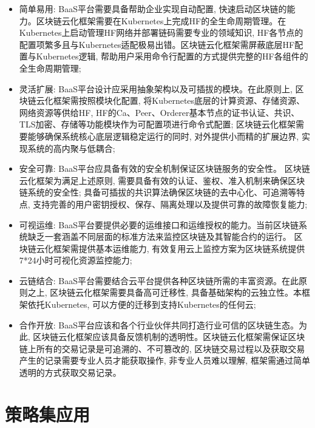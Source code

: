 \begin{itemize}[itemindent=2em]
    \item 简单易用: BaaS平台需要具备帮助企业实现自动配置, 快速启动区块链的能力。区块链云化框架需要在Kubernetes上完成HF的全生命周期管理。在Kubernetes上启动管理HF网络并部署链码需要专业的领域知识, HF各节点的配置项繁多且与Kubernetes适配极易出错。区块链云化框架需屏蔽底层HF配置与Kubernetes逻辑, 帮助用户采用命令行配置的方式提供完整的HF各组件的全生命周期管理;

    \item 灵活扩展: BaaS平台设计应采用抽象架构以及可插拔的模块。在此原则上, 区块链云化框架需按照模块化配置, 将Kubernetes底层的计算资源、存储资源、网络资源等供给HF, HF的Ca、Peer、Orderer基本节点的证书认证、共识、TLS加密、存储等功能模块作为可配置项进行命令式配置; 区块链云化框架需要能够确保系统核心底层逻辑稳定运行的同时, 对外提供小而精的扩展边界, 实现系统的高内聚与低耦合;

    \item 安全可靠: BaaS平台应具备有效的安全机制保证区块链服务的安全性。 区块链云化框架为满足上述原则, 需要具备有效的认证、鉴权、准入机制来确保区块链系统的安全性; 具备可插拔的共识算法确保区块链的去中心化、可追溯等特点, 支持完善的用户密钥授权、保存、隔离处理以及提供可靠的故障恢复能力;

    \item 可视运维: BaaS平台要提供必要的运维接口和运维授权的能力。当前区块链系统缺乏一套涵盖不同层面的标准方法来监控区块链及其智能合约的运行\cite{zhangfuli2021smartcontract}。 区块链云化框架需提供基本运维能力, 有效复用云上监控方案为区块链系统提供7*24小时可视化资源监控能力;

    \item 云链结合: BaaS平台需要结合云平台提供各种区块链所需的丰富资源。在此原则之上, 区块链云化框架需要具备高可迁移性, 具备基础架构的云独立性。本框架依托Kubernetes, 可以方便的迁移到支持Kubernetes的任何云;

    \item 合作开放: BaaS平台应该和各个行业伙伴共同打造行业可信的区块链生态。为此, 区块链云化框架应该具备反馈机制的透明性。区块链云化框架需保证区块链上所有的交易记录是可追溯的、不可篡改的, 区块链交易过程以及获取交易产生的记录需要专业人员才能获取操作, 非专业人员难以理解, 框架需通过简单透明的方式获取交易记录。
\end{itemize}

\section{策略集应用}\label{section: policy_set_application}

